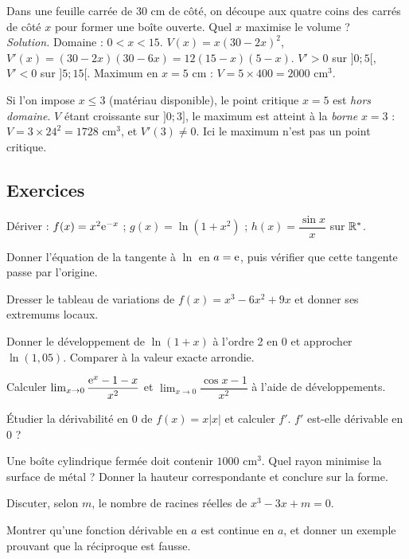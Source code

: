 \begin{exemple}
Dans une feuille carrée de $30$ cm de côté, on découpe aux quatre coins des carrés de côté $x$ pour former une boîte ouverte. Quel $x$ maximise le volume ?\\
\emph{Solution.} Domaine : $0<x<15$. $V(x)=x(30-2x)^2$, $V'(x)=(30-2x)(30-6x)=12(15-x)(5-x)$. $V'>0$ sur $]0;5[$, $V'<0$ sur $]5;15[$. Maximum en $x=5$ cm : $V=5\times400=2000$ cm$^3$.
\end{exemple}
\begin{cas}
Si l'on impose $x\le3$ (matériau disponible), le point critique $x=5$ est \emph{hors domaine}. $V$ étant croissante sur $]0;3]$, le maximum est atteint à la \emph{borne} $x=3$ : $V=3\times24^2=1728$ cm$^3$, et $V'(3)\ne0$. Ici le maximum n'est pas un point critique.
\end{cas}

\subsection{Exercices}
\begin{exo}[A]\label{c3e1}
Dériver : $f(x)=x^2\mathrm{e}^{-x}$ ; $g(x)=\ln(1+x^2)$ ; $h(x)=\dfrac{\sin x}x$ sur $\mathbb{R}^*$.
\end{exo}
\begin{exo}[A]\label{c3e2}
Donner l'équation de la tangente à $\ln$ en $a=\mathrm{e}$, puis vérifier que cette tangente passe par l'origine.
\end{exo}
\begin{exo}[A]\label{c3e3}
Dresser le tableau de variations de $f(x)=x^3-6x^2+9x$ et donner ses extremums locaux.
\end{exo}
\begin{exo}[B]\label{c3e4}
Donner le développement de $\ln(1+x)$ à l'ordre 2 en $0$ et approcher $\ln(1{,}05)$. Comparer à la valeur exacte arrondie.
\end{exo}
\begin{exo}[B]\label{c3e5}
Calculer $\lim_{x\to0}\dfrac{\mathrm{e}^x-1-x}{x^2}$ et $\lim_{x\to0}\dfrac{\cos x-1}{x^2}$ à l'aide de développements.
\end{exo}
\begin{exo}[B]\label{c3e6}
Étudier la dérivabilité en $0$ de $f(x)=x|x|$ et calculer $f'$. $f'$ est-elle dérivable en $0$ ?
\end{exo}
\begin{exo}[C]\label{c3e7}
Une boîte cylindrique fermée doit contenir $1000$ cm$^3$. Quel rayon minimise la surface de métal ? Donner la hauteur correspondante et conclure sur la forme.
\end{exo}
\begin{exo}[C]\label{c3e8}
Discuter, selon $m$, le nombre de racines réelles de $x^3-3x+m=0$.
\end{exo}
\begin{exo}[C]\label{c3e9}
Montrer qu'une fonction dérivable en $a$ est continue en $a$, et donner un exemple prouvant que la réciproque est fausse.
\end{exo}

